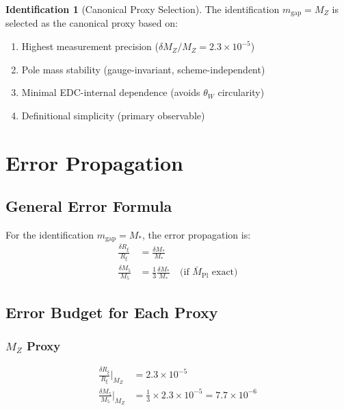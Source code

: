 \documentclass[11pt,a4paper]{article}
\newcommand{\Mpl}{\bar{M}_{\mathrm{Pl}}}
\newcommand{\Mfive}{M_5}
\newcommand{\Rxi}{R_\xi}
\newcommand{\mgap}{m_{\mathrm{gap}}}
\newcommand{\MZ}{M_Z}
\newcommand{\Mstar}{M_*}
\theoremstyle{definition}
\newtheorem{identification}{Identification}[section]
\theoremstyle{plain}
\theoremstyle{remark}
\begin{document}
\begin{identification}[Canonical Proxy Selection]
\label{id:canonical}
The identification $\mgap = \MZ$ is selected as the canonical proxy based on:
\begin{enumerate}
\item Highest measurement precision ($\delta\MZ/\MZ = 2.3 \times 10^{-5}$)
\item Pole mass stability (gauge-invariant, scheme-independent)
\item Minimal EDC-internal dependence (avoids $\theta_W$ circularity)
\item Definitional simplicity (primary observable)
\end{enumerate}
\end{identification}

\section{Error Propagation}
\label{sec:error}

\subsection{General Error Formula}

For the identification $\mgap = \Mstar$, the error propagation is:
\begin{align}
\frac{\delta\Rxi}{\Rxi} &= \frac{\delta\Mstar}{\Mstar} \label{eq:error-Rxi} \\
\frac{\delta\Mfive}{\Mfive} &= \frac{1}{3}\frac{\delta\Mstar}{\Mstar} \quad \text{(if }\Mpl\text{ exact)} \label{eq:error-M5}
\end{align}

\subsection{Error Budget for Each Proxy}

\subsubsection{$\MZ$ Proxy}
\begin{align}
\frac{\delta\Rxi}{\Rxi}\bigg|_{\MZ} &= 2.3 \times 10^{-5} \label{eq:error-Rxi-MZ} \\
\frac{\delta\Mfive}{\Mfive}\bigg|_{\MZ} &= \frac{1}{3} \times 2.3 \times 10^{-5} = 7.7 \times 10^{-6} \label{eq:error-M5-MZ}
\end{align}
\end{document}
